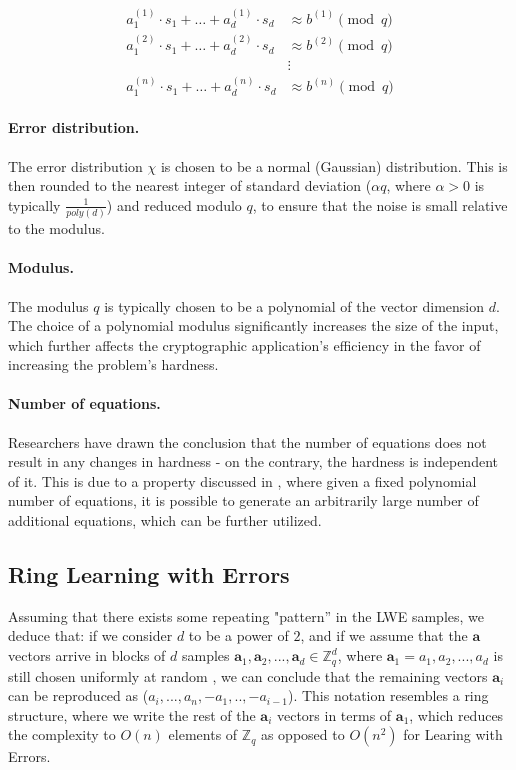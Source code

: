 \documentclass[11pt,
  titlepage=false,
  abstract=on,
]{scrreprt}
\begin{document}
\[
  \begin{aligned}
a_1^{(1)} \cdot s_1 + \dots + a_d^{(1)} \cdot s_d &\approx b^{(1)} \pmod{q} \\
a_1^{(2)} \cdot s_1 + \dots + a_d^{(2)} \cdot s_d &\approx b^{(2)} \pmod{q} \\
&\vdots \\
a_1^{(n)} \cdot s_1 + \dots + a_d^{(n)} \cdot s_d &\approx b^{(n)} \pmod{q}
\label{The Learning with Errors Problem}
\end{aligned}
\]

\paragraph{Error distribution.}
The error distribution $\chi$ is chosen to be a normal (Gaussian) distribution. This is then rounded to the nearest integer of standard deviation ($\alpha q$, where $\alpha > 0$ is typically $\frac{1}{poly(d)}$)
and reduced modulo $q$, to ensure that the noise is small relative to the modulus.

\paragraph{Modulus.} The modulus $q$ is typically chosen to be a polynomial of the vector dimension $d$. The choice of a polynomial modulus significantly increases the size of the input, which further affects
the cryptographic application's efficiency in the favor of increasing the problem's hardness.

\paragraph{Number of equations.} Researchers have drawn the conclusion that the number of equations does not result in any changes in hardness - on the contrary, the hardness is independent of it.
This is due to a property discussed in \cite{regev2010learning}, where given a fixed polynomial number of equations,  it is possible to generate an arbitrarily large number of additional equations, 
which can be further utilized.



\subsection{Ring Learning with Errors \cite{regev2010learning}} 
Assuming that there exists some repeating "pattern'' in the LWE samples, we deduce that: if we consider $d$ to be a power of $2$, and if we assume that the $\mathbf{a}$ vectors arrive in blocks of $d$ samples
$\mathbf{a}_1, \mathbf{a}_2,..., \mathbf{a}_d \in \mathbb{Z}^d_q$, where $\mathbf{a}_1 = a_1, a_2,..., a_d$ is still chosen uniformly at random , we can conclude that the remaining vectors $\mathbf{a}_i$
can be reproduced as ($a_i,..., a_n, -a_1,..,-a_{i-1}$). This notation resembles a ring structure, where we write the rest of the $\mathbf{a}_i$ vectors in terms of $\mathbf{a}_1$, which reduces the 
complexity to $O(n)$ elements of $\mathbb{Z}_q$ as opposed to $O(n^2)$ for Learing with Errors.
\end{document}
